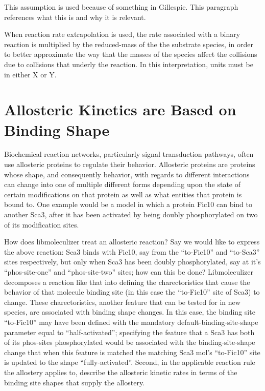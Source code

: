 This assumption is used because of something in Gillespie.  This
paragraph references what this is and why it is relevant.

When reaction rate extrapolation is used, the rate associated with a
binary reaction is multiplied by the reduced-mass of the the substrate
species, in order to better approximate the way that the masses of the
species affect the collisions due to collisions that underly the
reaction.  In this interpretation, units must be in either X or Y.

\section{Allosteric Kinetics are Based on Binding Shape}
Biochemical reaction networks, particularly signal transduction
pathways, often use allosteric proteins to regulate their
behavior. Allosteric proteins are proteins whose shape, and
consequently behavior, with regards to different interactions can
change into one of multiple different forms depending upon the state
of certain modifications on that protein as well as what entities that
protein is bound to.  One example would be a model in which a protein
Fic10 can bind to another Sca3, after it has been activated by being
doubly phosphorylated on two of its modification sites.  

How does libmoleculizer treat an allosteric reaction?  Say we would
like to express the above reaction: Sca3 binds with Fic10, say from
the ``to-Fic10'' and ``to-Sca3'' sites respectively, but only when
Sca3 has been doubly phosphorylated, say at it's ``phos-site-one'' and
``phos-site-two'' sites; how can this be done?  Libmoleculizer
decomposes a reaction like that into defining the charectoristics that
cause the behavior of that molecule binding site (in this case the
``to-Fic10'' site of Sca3) to change.  These charectoristics, another
feature that can be tested for in new species, are associated with
binding shape changes.  In this case, the binding site ``to-Fic10''
may have been defined with the mandatory default-binding-site-shape
parameter equal to ``half-activated''; specifying the feature that
a Sca3 has both of its phos-sites phosphorylated would be associated
with the binding-site-shape change that when this feature is matched
the matching Sca3 mol's ``to-Fic10'' site is updated to the shape
``fully-activated''.  Second, in the applicable reaction rule the
allostery applies to, describe the allosteric kinetic rates in terms
of the binding site shapes that supply the allostery. 

